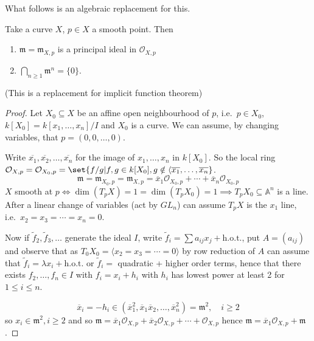 \documentclass{article}
\newcommand{\A}{\mathbb{A}}
\begin{document}
What follows is an algebraic replacement for this.
\begin{thm}
    Take a curve $X$, $p \in X$ a smooth point. Then
    \begin{enumerate}[label=(\roman*)]
        \item $\mathfrak{m} = \mathfrak{m}_{X, p}$ is a principal ideal in $\mathcal{O}_{X, p}$
        \item $\bigcap_{n \geq 1} \mathfrak{m}^n = \{0\}$.
    \end{enumerate}
\end{thm}
(This is a replacement for implicit function theorem)
\begin{proof}
    Let $X_0 \subseteq X$ be an affine open neighbourhood of $p$, i.e.\ $p \in X_0$, $k[X_0] = k[x_1, \dotsc, x_n] / I$ and $X_0$ is a curve.
    We can assume, by changing variables, that $p = (0, 0, \dotsc, 0)$.

    Write $\overline{x_1}, \overline{x_2}, \dotsc, \overline{x_n}$ for the image of $x_1, \dotsc, x_n$ in $k[X_0]$.
    So the local ring $\mathcal{O}_{X, p} = \mathcal{O}_{X_0, p} = \set{f / g | f, g \in k[X_0], g \notin \langle \overline{x_1}, \dotsc, \overline{x_n}}$.
    \begin{equation*}
        \mathfrak{m} = \mathfrak{m}_{X_0, p} = \mathfrak{m}_{X, p} = \overline{x}_1 \mathcal{O}_{X_0, p} + \dotsb + \overline{x}_n \mathcal{O}_{X_0, p}
    \end{equation*}
    $X$ smooth at $p \iff \dim(T_p X) = 1 = \dim(T_p X_0) = 1 \implies T_p X_0 \subseteq \A^n$ is a line.
    After a linear change of variables (act by $GL_n$) can assume $T_p X$ is the $x_1$ line, i.e.\ $x_2 = x_3 = \dotsb = x_n = 0$.

    Now if $\tilde{f}_2, \tilde{f}_3, \dotsc$ generate the ideal $I$, write $\tilde{f}_i = \sum a_{i j} x_j + \text{h.o.t.}$, put $A = (a_{ij})$
    and observe that as $T_0 X_0 = \langle x_2 = x_3 = \dotsb = 0 \rangle$ by row reduction of $A$ can assume that $\tilde{f}_i = \lambda x_i + \text{h.o.t.}$ or $\tilde{f}_i = $ quadratic + higher order terms, hence that there exists $f_2, \dotsc, f_n \in I$ with $f_i = x_i + h_i$ with $h_i$ has lowest power at least 2 for $1 \leq i \leq n$.

    \begin{equation*}
        \overline{x}_i = -h_i \in (\overline{x}_1^2, \overline{x}_1 \overline{x}_2, \dotsc, \overline{x}_n^2) = \mathfrak{m}^2, \quad i \geq 2
    \end{equation*}
    so $x_i \in \mathfrak{m}^2, i \geq 2$ and so $\mathfrak{m} = \overline{x}_1 \mathcal{O}_{X, p} + \overline{x}_2 \mathcal{O}_{X, p} + \dotsb + \mathcal{O}_{X, p}$ hence $\mathfrak{m} = \overline{x}_1 \mathcal{O}_{X, p} + \mathfrak{m}$.


\end{proof}
\end{document}

